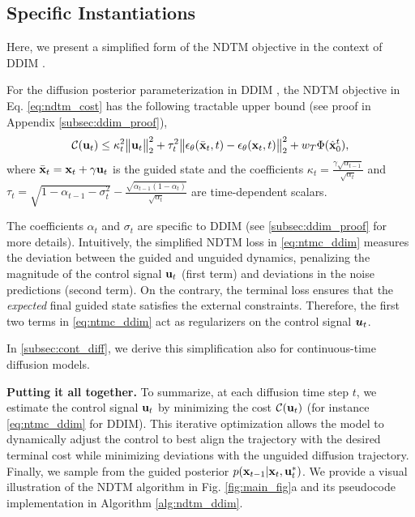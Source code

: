 \subsection{Specific Instantiations}
\label{sec:instantiate}
Here, we present a simplified form of the NDTM objective in the context of DDIM \citep{song2022denoisingdiffusionimplicitmodels}.
\begin{proposition}
    \label{prop:simplified-objective}
    For the diffusion posterior parameterization in DDIM \citep{song2022denoisingdiffusionimplicitmodels}, the NDTM objective in Eq. \ref{eq:ndtm_cost} has the following tractable upper bound (see proof in Appendix \ref{subsec:ddim_proof}),
    \begin{equation}
        {\mathcal{C}}({\mathbf{u}}_t) \leq \kappa_t^2\big\Vert {\mathbf{u}}_t \big\Vert_2^2 + \tau_t^2 \big\Vert \epsilon_\theta(\bar{{\mathbf{x}}}_t, t) - \epsilon_\theta({\mathbf{x}}_t, t) \big\Vert_2^2 + w_T\Phi(\hat{{\mathbf{x}}}_0^t),
        \label{eq:ntmc_ddim}
    \end{equation}
    where $\bar{{\mathbf{x}}}_t = {\mathbf{x}}_t + \gamma {\mathbf{u}}_t$ is the guided state and the coefficients $\kappa_t = \frac{\gamma \sqrt{\alpha_{t-1}}}{\sqrt{\alpha_t}}$ and $\tau_t = \sqrt{1 - \alpha_{t-1} - \sigma_t^2} - \frac{\sqrt{\alpha_{t-1}(1 - \alpha_t)}}{\sqrt{\alpha_t}}$ are time-dependent scalars.
\end{proposition}
The coefficients $\alpha_t$ and $\sigma_t$ are specific to DDIM (see \cref{subsec:ddim_proof} for more details). Intuitively, the simplified NDTM loss in \cref{eq:ntmc_ddim} measures the deviation between the guided and unguided dynamics, penalizing the magnitude of the control signal ${\mathbf{u}}_t$ (first term) and deviations in the noise predictions (second term). On the contrary, the terminal loss ensures that the \emph{expected} final guided state satisfies the external constraints. Therefore, the first two terms in \cref{eq:ntmc_ddim} act as regularizers on the control signal ${\bm{u}}_t$.

In \cref{subsec:cont_diff}, we derive this simplification also for continuous-time diffusion models.


\textbf{Putting it all together.} To summarize, at each diffusion time step $t$, we estimate the control signal ${\mathbf{u}}_t$ by minimizing the cost ${\mathcal{C}}({\mathbf{u}}_t)$ (for instance \cref{eq:ntmc_ddim} for DDIM). This iterative optimization allows the model to dynamically adjust the control to best align the trajectory with the desired terminal cost while minimizing deviations with the unguided diffusion trajectory. Finally, we sample from the guided posterior $p({\mathbf{x}}_{t-1}|{\mathbf{x}}_t, {\mathbf{u}}_t^*)$. We provide a visual illustration of the NDTM algorithm in Fig. \ref{fig:main_fig}a and its pseudocode implementation in Algorithm \ref{alg:ndtm_ddim}.



